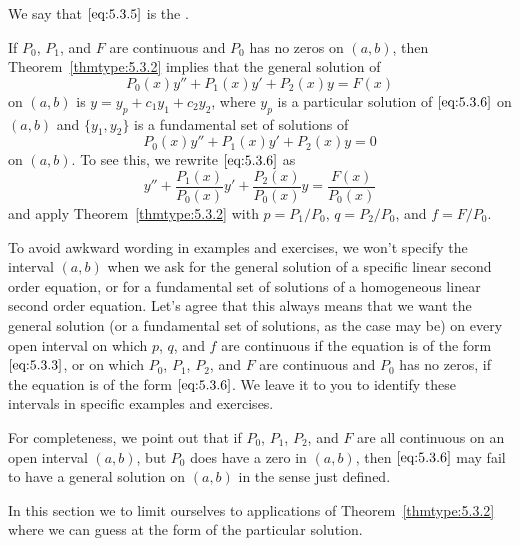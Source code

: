\documentclass{ximera}
\begin{document}
We say that $\eqref{eq:5.3.5}$ is the .
 
 
If $P_0$, $P_1$, and $F$ are continuous and $P_0$ has no zeros on $(a,b)$, then  Theorem~\ref{thmtype:5.3.2} implies that the general
solution of
\begin{equation} \label{eq:5.3.6}
P_0(x)y''+P_1(x)y'+P_2(x)y=F(x)
\end{equation}
on $(a,b)$ is $y=y_p+c_1y_1+c_2y_2$, where $y_p$ is a particular
solution of $\eqref{eq:5.3.6}$ on $(a,b)$ and $\{y_1,y_2\}$ is a
fundamental set of solutions of
$$
P_0(x)y''+P_1(x)y'+P_2(x)y=0
$$
on $(a,b)$. To see this, we rewrite $\eqref{eq:5.3.6}$ as
$$
y''+\frac{P_1(x)}{P_0(x)}y'+\frac{P_2(x)}{P_0(x)}y=\frac{F(x)}{P_0(x)}
$$
and apply Theorem~\ref{thmtype:5.3.2} with $p=P_1/P_0$, $q=P_2/P_0$, and
$f=F/P_0$.
 
 
To avoid awkward wording in examples and exercises, we won't specify
the interval $(a,b)$ when we ask for the general solution of a
specific linear second order equation, or for a fundamental set of
solutions of a homogeneous linear second order equation. Let's agree
that this always means that we want the general solution (or a
fundamental set of solutions, as the case may be) on every open
interval on which $p$, $q$, and $f$ are continuous if the equation is
of the form $\eqref{eq:5.3.3}$, or on which $P_0$, $P_1$, $P_2$, and $F$ are
continuous and $P_0$ has no zeros, if the equation is of the form
$\eqref{eq:5.3.6}$. We leave it to you to identify these intervals in
specific examples and exercises.
 
For completeness, we point out that if $P_0$, $P_1$, $P_2$, and $F$ are
all continuous on an open interval $(a,b)$, but $P_0$ does
have a zero in $(a,b)$, then $\eqref{eq:5.3.6}$ may fail to have a general
solution on $(a,b)$ in the sense just defined.
 
In this section we to limit ourselves to applications of
Theorem~\ref{thmtype:5.3.2} where we can guess at the form of the
particular solution.
 
\end{document}
